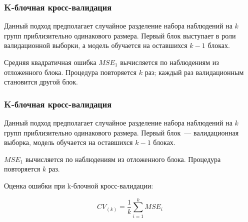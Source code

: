 \documentclass{beamer}
\begin{document}
\begin{frame}
  \frametitle{K-блочная кросс-валидация}

  Данный подход предполагает случайное разделение набора наблюдений на $k$ групп приблизительно одинакового размера. Первый блок выступает в роли валидационной выборки, а модель обучается на оставшихся $k - 1$ блоках.

  \vspace{0.3cm}

  Средняя квадратичная ошибка $MSE_1$ вычисляется по наблюдениям из отложенного блока. Процедура повторяется $k$ раз; каждый раз валидационным становится другой блок.

\end{frame}

\begin{frame}
  \frametitle{K-блочная кросс-валидация}

  Данный подход предполагает случайное разделение набора наблюдений на $k$ групп приблизительно одинакового размера. Первый блок~--- валидационная выборка, модель обучается на оставшихся $k - 1$ блоках.

  \vspace{0.2cm}

  $MSE_1$ вычисляется по наблюдениям из отложенного блока. Процедура повторяется $k$ раз.

  \vspace{0.2cm}

  Оценка ошибки при k-блочной кросс-валидации:

  $$CV_{(k)} = \frac{1}{k} \sum_{i=1}^{k} MSE_i$$

\end{frame}
\end{document}
